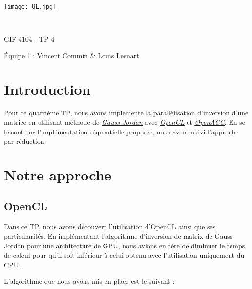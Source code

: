 \documentclass[a4paper, french]{article}
\author{Vincent Commin \& Louis Leenart}
\date{\today}
\begin{document}
\begin{titlepage}
    \begin{flushleft}
        \texttt{[image: UL.jpg]}\par
        \centering

        \vspace{13\baselineskip}
        \HRule \\[0.4cm]

        {\Huge
        GIF-4104 - TP 4\par}
        \vspace{0.4cm}
        \HRule
        \vfill
        Équipe 1 : Vincent Commin \& Louis Leenart\medskip \par
    \end{flushleft}
\end{titlepage}

\newpage
\section{Introduction}

Pour ce quatrième TP, nous avons implémenté la parallélisation d'inversion d'une matrice en utilisant
méthode de \href{https://fr.wikipedia.org/wiki/%C3%89limination_de_Gauss-Jordan}{\textit{\underline{Gauss Jordan}}}
avec  \href{https://www.khronos.org/opencl/}{\textit{\underline{OpenCL}}} et \href{https://www.openacc.org/}{\textit{\underline{OpenACC}}}. En se basant sur l'implémentation séquentielle proposée, nous avons suivi l'approche par réduction.

\section{Notre approche}

\subsection{OpenCL}

Dans ce TP, nous avons découvert l'utilisation d'OpenCL ainsi que ses particularités. En implémentant l'algorithme d'inversion de matrix de Gauss Jordan pour une architecture de GPU, nous avions en tête de diminuer le temps de calcul pour qu'il soit inférieur à celui obtenu avec l'utilisation uniquement du CPU.

L'algorithme que nous avons mis en place est le suivant :
\end{document}
